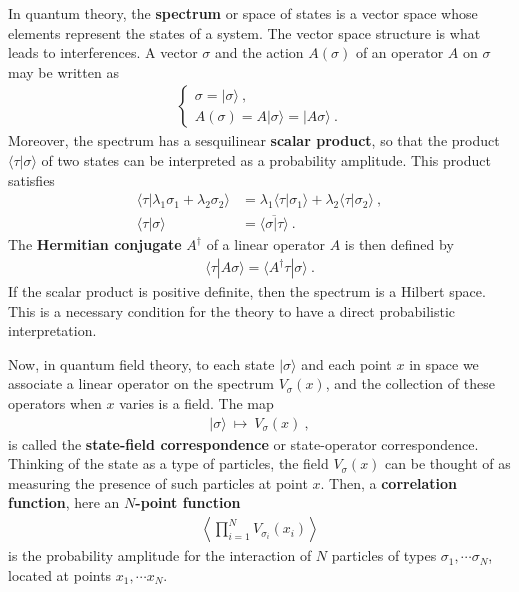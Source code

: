 \documentclass[12pt,a4paper,notitlepage]{report}
\numberwithin{equation}{section}
\theoremstyle{break}
\begin{document}
In quantum theory, the \textbf{\boldmath spectrum} or space of states is a vector space whose elements represent the states of a system.
The vector space structure is what leads to interferences.
A vector $\sigma$ and the action $A(\sigma)$ of an operator $A$ on $\sigma$ may be written as 
\begin{align}
\left\{\begin{array}{l} 
 \sigma = |\sigma\rangle\ , \\ A(\sigma) = A|\sigma\rangle = |A\sigma\rangle\ .
\end{array}\right. 
\end{align}
Moreover, the spectrum has a sesquilinear \textbf{\boldmath scalar product}, so that the product $\langle \tau|\sigma \rangle$ of two states can be interpreted as a probability amplitude.
This product satisfies
\begin{align}
\langle \tau| \lambda_1\sigma_1+\lambda_2\sigma_2\rangle &= \lambda_1 \langle \tau|\sigma_1\rangle + \lambda_2\langle \tau|\sigma_2\rangle\ ,
\\
\langle \tau|\sigma \rangle &= \overline{\langle \sigma|\tau\rangle}\ .
\end{align}
The \textbf{\boldmath Hermitian conjugate} $A^\dagger$ of a linear operator $A$ is then defined by
\begin{align}
 \langle \tau | A \sigma\rangle = \langle A^\dagger \tau | \sigma\rangle\ .
\label{lld}
\end{align}
If the scalar product is positive definite, then the spectrum is a Hilbert space.
This is a necessary condition for the theory to have a direct probabilistic interpretation.

Now, in quantum field theory, to each state $|\sigma\rangle$ and each point $x$ in space we associate a linear operator on the spectrum $V_\sigma(x)$, and the collection of these operators when $x$ varies is a field. 
The map 
\begin{align}
 |\sigma \rangle  \ \mapsto \ V_\sigma(x)\ ,
\end{align}
is called the \textbf{\boldmath state-field correspondence} or state-operator correspondence.
Thinking of the state as a type of particles, the field $V_\sigma(x)$ can be thought of as measuring the presence of such particles at point $x$.
Then, a \textbf{\boldmath correlation function}, here an \textbf{\boldmath $N$-point function}
\begin{align}
\left\langle \prod_{i=1}^N V_{\sigma_i}(x_i)\right\rangle
\label{pva}
\end{align}
is the probability amplitude for the interaction of $N$ particles of types $\sigma_1,\cdots \sigma_N$, located at points $x_1,\cdots x_N$. 
\end{document}
